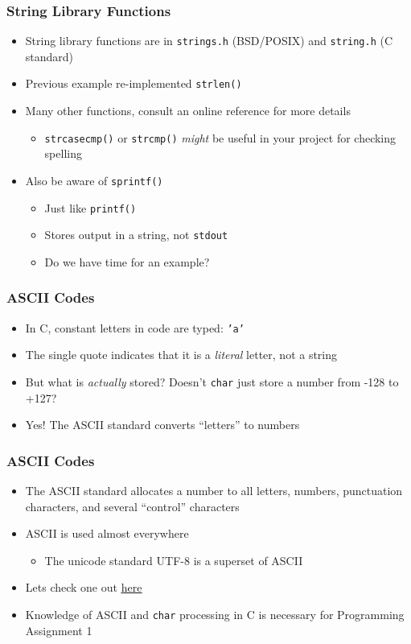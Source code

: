 \documentclass[14pt]{beamer}
\begin{document}
\begin{frame}
\frametitle{String Library Functions}
\begin{itemize}
\item String library functions are in \texttt{strings.h} (BSD/POSIX) and \texttt{string.h} (C standard)
\item Previous example re-implemented \texttt{strlen()}
\item Many other functions, consult an online reference for more details
	\begin{itemize}
		\item \texttt{strcasecmp()} or \texttt{strcmp()} \textit{might} be useful in your project for checking spelling
	\end{itemize}
\item Also be aware of \texttt{sprintf()}
	\begin{itemize}
		\item Just like \texttt{printf()}
		\item Stores output in a string, not \texttt{stdout}
		\item Do we have time for an example?
	\end{itemize}
\end{itemize}
\end{frame}

\begin{frame}
\frametitle{ASCII Codes}
\begin{itemize}
\item In C, constant letters in code are typed: \texttt{'a'}
\item The single quote indicates that it is a \textit{literal} letter, not a string
\pause
\item But what is \textit{actually} stored? Doesn't \texttt{char} just store a number from -128 to +127?
\pause
\item Yes! The ASCII standard converts ``letters'' to numbers
\end{itemize}
\end{frame}

\begin{frame}
\frametitle{ASCII Codes}
\begin{itemize}
\item The ASCII standard allocates a number to all letters, numbers, punctuation characters, and several ``control'' characters
\item ASCII is used almost everywhere
	\begin{itemize}
		\item The unicode standard UTF-8 is a superset of ASCII
	\end{itemize}
\item Lets check one out \underline{\href{http://asciichart.com/}{here}}
\item Knowledge of ASCII and \texttt{char} processing in C is necessary for Programming Assignment 1
\end{itemize}
\end{frame}
\end{document}
